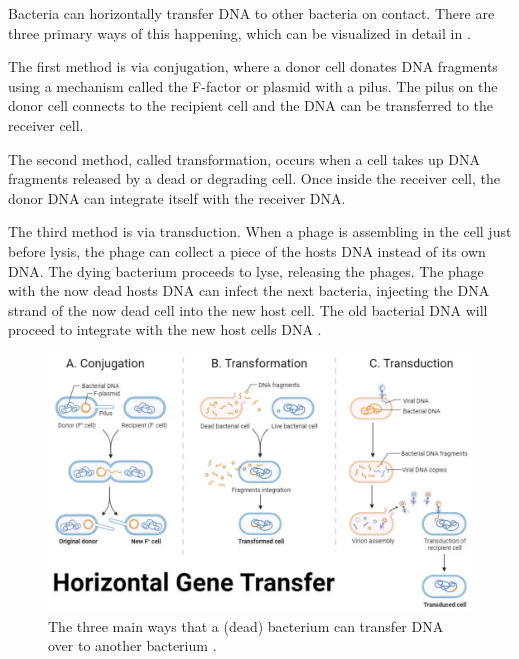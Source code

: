 Bacteria can horizontally transfer DNA to other bacteria on contact. 
There are three primary ways of this happening, which can be visualized in detail in . 

The first method is via conjugation, where a donor cell donates DNA fragments using a mechanism called the F-factor or plasmid with a pilus. 
The pilus on the donor cell connects to the recipient cell and the DNA can be transferred to the receiver cell. 

The second method, called transformation, occurs when a cell takes up DNA fragments released by a dead or degrading cell. 
Once inside the receiver cell, the donor DNA can integrate itself with the receiver DNA. 

The third method is via transduction. 
When a phage is assembling in the cell just before lysis, the phage can collect a piece of the hosts DNA instead of its own DNA. 
The dying bacterium proceeds to lyse, releasing the phages. 
The phage with the now dead hosts DNA can infect the next bacteria, injecting the DNA strand of the now dead cell into the new host cell. 
The old bacterial DNA will proceed to integrate with the new host cells DNA \cite{tamangHorizontalGeneTransfer2023}. 

\begin{figure}
    \centering
    \includegraphics[width=0.7\linewidth]{Figures/horizontal_gene_transfer.png}
    \caption{The three main ways that a (dead) bacterium can transfer DNA over to another bacterium \cite{tamangHorizontalGeneTransfer2023}.}
    \label{fig:horizontal_gene_transfer}
\end{figure}

